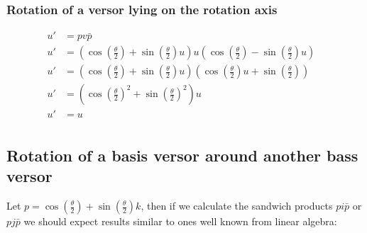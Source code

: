 \subsubsection{Rotation of a versor lying on the rotation axis}
\begin{equation}
    \begin{aligned}
        u'&=pv\bar{p}&\mbox{}\\[1.25ex]
        u'&=(\cos{(\frac{\theta}{2})}+\sin{(\frac{\theta}{2})u})u(\cos{(\frac{\theta}{2})}-\sin{(\frac{\theta}{2})u})&\mbox{}\\[1.25ex]
        u'&=(\cos{(\frac{\theta}{2})}+\sin{(\frac{\theta}{2})u})(\cos{(\frac{\theta}{2})}u+\sin{(\frac{\theta}{2})})&\mbox{}\\[1.25ex]
        u'&=(\cos{(\frac{\theta}{2})}^{2} + \sin{(\frac{\theta}{2})}^{2})u&\mbox{}\\[1.25ex]
        u'&=u&\mbox{}\\[1.25ex]
    \end{aligned}
\end{equation}
\subsection{Rotation of a basis versor around another bass versor}
Let $p = \cos{(\frac{\theta}{2})} + \sin{(\frac{\theta}{2})}k$, then if we calculate the sandwich products $pi\bar{p}$ or  $pj\bar{p}$ we should expect results similar to ones well known from linear algebra:\\

